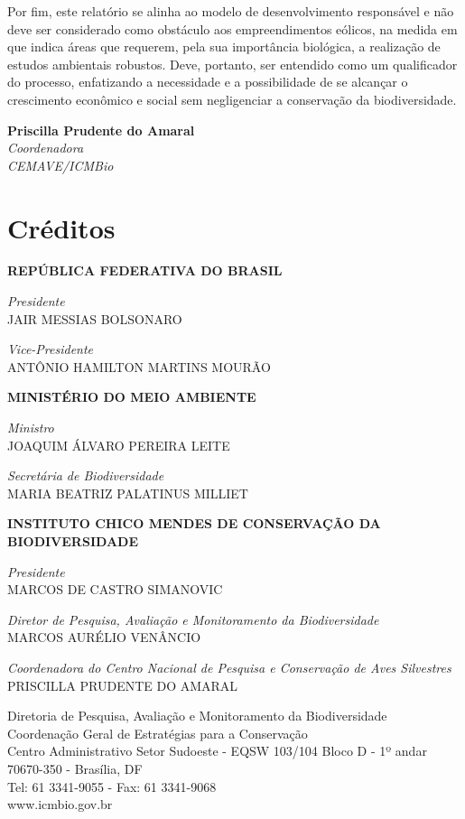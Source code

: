 \documentclass[
  oneside]{scrbook}
\begin{document}
Por fim, este relatório se alinha ao modelo de desenvolvimento responsável e não deve ser considerado como obstáculo aos empreendimentos eólicos, na medida em que indica áreas que requerem, pela sua importância biológica, a realização de estudos ambientais robustos. Deve, portanto, ser entendido como um qualificador do processo, enfatizando a necessidade e a possibilidade de se alcançar o crescimento econômico e social sem negligenciar a conservação da biodiversidade.

\textbf{Priscilla Prudente do Amaral}\\
\emph{Coordenadora}\\
\emph{CEMAVE/ICMBio}

\hypertarget{creditos}{%
\chapter*{Créditos}\label{creditos}}


\textbf{REPÚBLICA FEDERATIVA DO BRASIL}

\emph{Presidente}\\
JAIR MESSIAS BOLSONARO

\emph{Vice-Presidente}\\
ANTÔNIO HAMILTON MARTINS MOURÃO

\textbf{MINISTÉRIO DO MEIO AMBIENTE}

\emph{Ministro}\\
JOAQUIM ÁLVARO PEREIRA LEITE

\emph{Secretária de Biodiversidade}\\
MARIA BEATRIZ PALATINUS MILLIET

\textbf{INSTITUTO CHICO MENDES DE CONSERVAÇÃO DA BIODIVERSIDADE}

\emph{Presidente}\\
MARCOS DE CASTRO SIMANOVIC

\emph{Diretor de Pesquisa, Avaliação e Monitoramento da Biodiversidade}\\
MARCOS AURÉLIO VENÂNCIO

\emph{Coordenadora do Centro Nacional de Pesquisa e Conservação de Aves Silvestres}\\
PRISCILLA PRUDENTE DO AMARAL

Diretoria de Pesquisa, Avaliação e Monitoramento da Biodiversidade\\
Coordenação Geral de Estratégias para a Conservação\\
Centro Administrativo Setor Sudoeste - EQSW 103/104 Bloco D - 1º andar\\
70670-350 - Brasília, DF\\
Tel: 61 3341-9055 - Fax: 61 3341-9068\\
www.icmbio.gov.br
\end{document}
